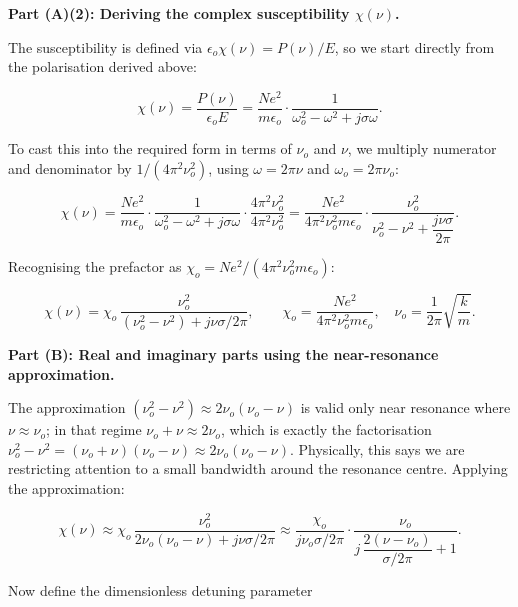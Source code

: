 \textbf{Part (A)(2): Deriving the complex susceptibility $\chi(\nu)$.}

The susceptibility is defined via $\epsilon_o\chi(\nu) = P(\nu)/E$, so we start directly from the polarisation derived above:

\begin{equation*}
  \chi(\nu) = \frac{P(\nu)}{\epsilon_o E}
  = \frac{Ne^2}{m\epsilon_o}\cdot\frac{1}{\omega_o^2 - \omega^2 + j\sigma\omega}.
\end{equation*}

To cast this into the required form in terms of $\nu_o$ and $\nu$, we multiply numerator and denominator by $1/(4\pi^2\nu_o^2)$, using $\omega = 2\pi\nu$ and $\omega_o = 2\pi\nu_o$:

\begin{equation*}
  \chi(\nu)
  = \frac{Ne^2}{m\epsilon_o}\cdot\frac{1}{\omega_o^2 - \omega^2 + j\sigma\omega}
    \cdot\frac{4\pi^2\nu_o^2}{4\pi^2\nu_o^2}
  = \frac{Ne^2}{4\pi^2\nu_o^2 m\epsilon_o}
    \cdot\frac{\nu_o^2}{\nu_o^2 - \nu^2 + \dfrac{j\nu\sigma}{2\pi}}.
\end{equation*}

Recognising the prefactor as $\chi_o = Ne^2/(4\pi^2\nu_o^2 m\epsilon_o)$:

\begin{equation*}
  \boxed{\chi(\nu) = \chi_o\,\frac{\nu_o^2}{(\nu_o^2-\nu^2)+j\nu\sigma/2\pi},
  \qquad \chi_o = \frac{Ne^2}{4\pi^2\nu_o^2 m\epsilon_o},
  \quad \nu_o = \frac{1}{2\pi}\sqrt{\frac{k}{m}}.}
\end{equation*}

\textbf{Part (B): Real and imaginary parts using the near-resonance approximation.}

The approximation $(\nu_o^2 - \nu^2) \approx 2\nu_o(\nu_o - \nu)$ is valid only near resonance where $\nu \approx \nu_o$; in that regime $\nu_o + \nu \approx 2\nu_o$, which is exactly the factorisation $\nu_o^2 - \nu^2 = (\nu_o+\nu)(\nu_o-\nu) \approx 2\nu_o(\nu_o-\nu)$. Physically, this says we are restricting attention to a small bandwidth around the resonance centre. Applying the approximation:

\begin{equation*}
  \chi(\nu) \approx \chi_o\,\frac{\nu_o^2}{2\nu_o(\nu_o-\nu)+j\nu\sigma/2\pi}
  \approx \frac{\chi_o}{j\nu_o\sigma/2\pi}\cdot\frac{\nu_o}{j\,\dfrac{2(\nu-\nu_o)}{\sigma/2\pi}+1}.
\end{equation*}

Now define the dimensionless detuning parameter

